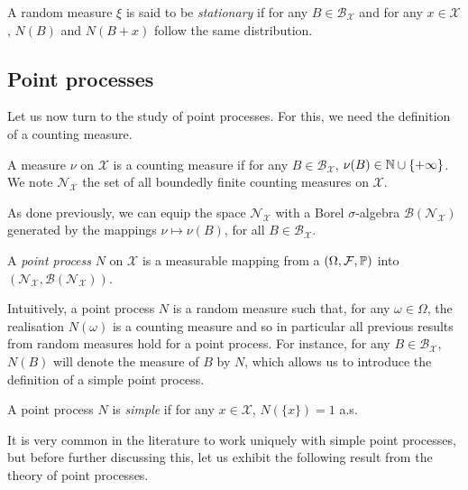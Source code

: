 \begin{definition}
    A random measure $\xi$ is said to be \emph{stationary} if 
    for any $B\in\mathcal{B}_{\mathcal{X}}$ and for any $x\in\mathcal{X}$, $N(B)$ and $N(B+x)$ follow the same distribution.
\end{definition}

\subsection{Point processes}

Let us now turn to the study of point processes. For this, we need the definition of a counting measure.

\begin{definition}
    A measure $\nu$ on $\mathcal{X}$ is a counting measure if for any $B\in\mathcal{B}_{\mathcal{X}}$, $\nu(B)\in{\mathbb N} \cup \{+\infty\}$.
    We note $\mathcal{N}_{\mathcal{X}}$ the set of all boundedly finite counting measures on $\mathcal{X}$.
\end{definition}

As done previously, we can equip the space $\mathcal{N}_{\mathcal{X}}$ with a Borel $\sigma$-algebra $\mathcal{B}(\mathcal{N}_{\mathcal{X}})$ generated by the mappings $\nu \mapsto \nu(B)$, for all $B\in\mathcal{B}_{\mathcal{X}}$.

\begin{definition}
    A \emph{point process} $N$ on $\mathcal{X}$ is a measurable mapping from a $(\Omega, \mathcal{F}, {\mathbb P})$ into $(\mathcal{N}_{\mathcal{X}}, \mathcal{B}(\mathcal{N}_{\mathcal{X}}))$.
\end{definition}

Intuitively, a point process $N$ is a random measure \parencite[Corollary 1.6.4.]{Baccelli2020} such that, for any $\omega\in\Omega$, the realisation $N(\omega)$ is a counting measure and so in particular all previous results from random measures hold for a point process.
For instance, for any $B\in\mathcal{B}_{\mathcal{X}}$, $N(B)$ will denote the measure of $B$ by $N$, which allows us to introduce the definition of a simple point process.

\begin{definition}
A point process $N$ is \emph{simple} if for any $x\in\mathcal{X}$, $N(\{x\}) = 1$ a.s.
\end{definition}

It is very common in the literature to work uniquely with simple point processes, but before further discussing this, let us exhibit the following result from the theory of point processes.

